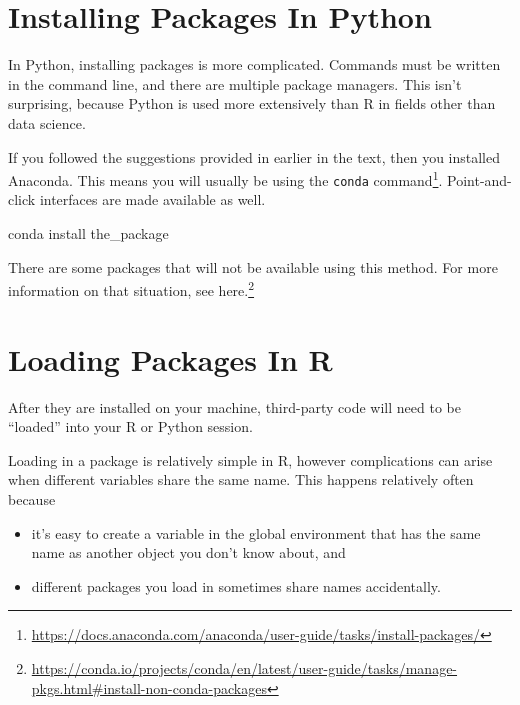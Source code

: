 \documentclass[
  12pt,
]{krantz}
\makeatletter
\newenvironment{Shaded}{\begin{snugshade}}{\end{snugshade}}
\newcommand{\ExtensionTok}[1]{#1}
\newcommand{\NormalTok}[1]{#1}
\providecommand{\tightlist}{%
  \setlength{\itemsep}{0pt}\setlength{\parskip}{0pt}}
\renewcommand{\href}[2]{#2\footnote{\url{#1}}}
\newenvironment{kframe}{%
\medskip{}
\setlength{\fboxsep}{.8em}
 \def\at@end@of@kframe{}%
 \ifinner\ifhmode%
  \def\at@end@of@kframe{\end{minipage}}%
  \begin{minipage}{\columnwidth}%
 \fi\fi%
 \def\FrameCommand##1{\hskip\@totalleftmargin \hskip-\fboxsep
 \colorbox{shadecolor}{##1}\hskip-\fboxsep
     \hskip-\linewidth \hskip-\@totalleftmargin \hskip\columnwidth}%
 \MakeFramed {\advance\hsize-\width
   \@totalleftmargin\z@ \linewidth\hsize
   \@setminipage}}%
 {\par\unskip\endMakeFramed%
 \at@end@of@kframe}
\renewenvironment{Shaded}{\begin{kframe}}{\end{kframe}}
\makeatother
\begin{document}
\hypertarget{installing-packages-in-python}{%
\section{Installing Packages In Python}\label{installing-packages-in-python}}

In Python, installing packages is more complicated. Commands must be written in the command line, and there are multiple package managers. This isn't surprising, because Python is used more extensively than R in fields other than data science.

If you followed the suggestions provided in earlier in the text, then you installed Anaconda. This means you will usually be using the \href{https://docs.anaconda.com/anaconda/user-guide/tasks/install-packages/}{\texttt{conda} command}. Point-and-click interfaces are made available as well.

\begin{Shaded}
\begin{Highlighting}[]
\ExtensionTok{conda}\NormalTok{ install the\_package}
\end{Highlighting}
\end{Shaded}

There are some packages that will not be available using this method. For more information on that situation, see \href{https://conda.io/projects/conda/en/latest/user-guide/tasks/manage-pkgs.html\#install-non-conda-packages}{here.}

\hypertarget{loading-packages-in-r}{%
\section{Loading Packages In R}\label{loading-packages-in-r}}

After they are installed on your machine, third-party code will need to be ``loaded'' into your R or Python session.

Loading in a package is relatively simple in R, however complications can arise when different variables share the same name. This happens relatively often because

\begin{itemize}
\tightlist
\item
  it's easy to create a variable in the global environment that has the same name as another object you don't know about, and
\item
  different packages you load in sometimes share names accidentally.
\end{itemize}
\end{document}
